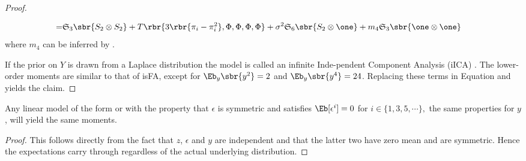 \documentclass[twoside,11pt]{article}
\newcommand{\symm}{\mathfrak{S}}
\begin{document}
{\begin{proof}
\begin{description*}
\begin{align}
 =&  \symm_3 \sbr{S_2 \otimes S_2} +T\rbr{3\rbr{ \pi_i - \pi_i^2}, \Phi, \Phi, \Phi, \Phi }
 + \sigma^2 \symm_6\sbr{S_2 \otimes \one}+ m_4 \symm_3 \sbr{\one\otimes \one}  \nonumber
\end{align}
where $m_4$ can be inferred by .
\end{description*}
If the prior on $Y$ is drawn from a Laplace distribution the model is
called an infinite Inde-pendent Component Analysis (iICA) \citep{KnoGha07}. The lower-order moments are similar to that of isFA, except for
$\Eb_y\sbr{y^2} = 2$ and $\Eb_y\sbr{y^4} = 24$. Replacing these terms
in Equation  and  yields the claim.
\end{proof}

\begin{lemma}
  \label{lem:bound}
  Any linear model of the form  or  with
  the property that $\epsilon$ is symmetric and satisfies
  $\Eb[\epsilon^i] = 0$ for $i \in \{1,3, 5,\cdots\},$ the same
  properties for $y$, will yield the same moments.
\end{lemma}
\begin{proof}
  This follows directly from the fact that $z$, $\epsilon$ and $y$
  are independent and that the latter two have zero mean and are
  symmetric. Hence the expectations carry through regardless of the
  actual underlying distribution.
\end{proof}
}
\end{document}
